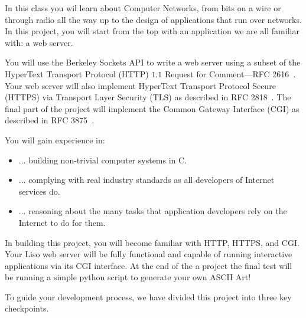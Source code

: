 In this class you wil learn about Computer Networks, from bits on a wire or through radio all the way up to the design of applications that run over networks. 
In this project, you will start from the top with an application we are all familiar with: a web server.

You will use the Berkeley Sockets API to write a web
server using a subset of the HyperText Transport Protocol (HTTP) $1.1$ Request
for Comment---RFC 2616~\cite{httprfc}.  Your web server will also implement
HyperText Transport Protocol Secure (HTTPS) via Transport Layer Security (TLS)
as described in RFC 2818~\cite{httpsrfc}.  The final part of the project will
implement the Common Gateway Interface (CGI) as described in RFC
3875~\cite{cgirfc}.  

You will gain experience in:
\begin{itemize}
  \item ... building non-trivial computer systems in C.
  \item ... complying with real industry standards as all developers of Internet services do.
  \item ... reasoning about the many tasks that application developers rely on the Internet to do for them.
\end{itemize}

In building this project, you will become familiar with HTTP, HTTPS, and CGI. Your Liso web server will be fully functional and capable of running interactive applications via its CGI interface. At the end of the a project the final test will be running a
simple python script to generate your own ASCII Art!

To guide your development process, we have divided this project into three key checkpoints.
